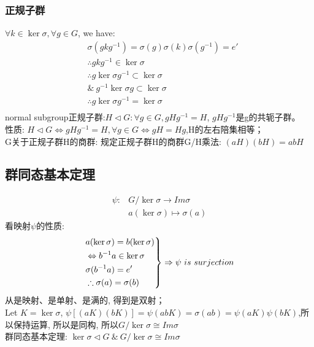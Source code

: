 \documentclass[UTF8]{../09-Mathematics}
\begin{document}
\subsubsection{正规子群}
$ \forall k \in \ker \sigma, \forall g\in G$, we have:
\begin{equation}
\begin{split}
&\sigma(gkg^{-1})=\sigma(g)\sigma(k)\sigma(g^{-1})=e'\\
& \therefore gkg^{-1}\in \ker \sigma\\
& \therefore g \ker \sigma g^{-1} \subset \ker \sigma\\
& \& \ g^{-1}  \ker \sigma g\subset \ker \sigma\\
& \therefore g \ker \sigma g^{-1}=\ker \sigma\\
\end{split}
\end{equation}
normal subgroup正规子群:$H \lhd G :\forall g \in G, gHg^{-1}=H$, $gHg^{-1}$是g的共轭子群。\\
性质: $H \lhd G \Leftrightarrow gHg^{-1}=H,\forall g \in G \Leftrightarrow gH=Hg$,H的左右陪集相等；\\
G关于正规子群H的商群: 规定正规子群H的商群G/H乘法: $(aH)(bH)=abH$\\
\subsection{群同态基本定理}
\begin{equation}
\begin{split}
\psi : &G/ \ker \sigma \to Im \sigma\\
& a (\ker \sigma) \mapsto \sigma(a)
\end{split}
\end{equation}
看映射$\psi$的性质: 
\begin{equation}
\label{证明同构1}
\left.
\begin{aligned}
& a(\ker \sigma)=b(\ker \sigma)\\
& \Leftrightarrow b^{-1}a \in \ker \sigma\\
&\sigma(b^{-1}a)=e'\\
&\therefore \sigma(a)=\sigma(b)
\end{aligned}
\right\} \Rightarrow \psi \ is \ surjection\\
\end{equation}
从是映射、是单射、是满的, 得到是双射；\\
Let $K=\ker \sigma$, $\psi [(aK)(bK)]=\psi (abK)=\sigma(ab)=\psi(aK)\psi(bK)$,所以保持运算, 所以是同构, 所以$G/ \ker \sigma \cong Im \sigma$\\
群同态基本定理: $\ker \sigma \lhd G \ \& \   G/ \ker \sigma \cong Im \sigma  $ 
\end{document}
